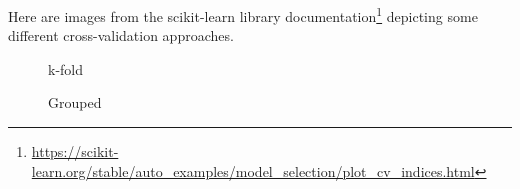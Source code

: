 \documentclass[
  letterpaper,
]{krantz}
\DeclareRobustCommand{\href}[2]{#2\footnote{\url{#1}}}
\begin{document}
Here are images from the
\href{https://scikit-learn.org/stable/auto_examples/model_selection/plot_cv_indices.html}{scikit-learn
library documentation} depicting some different cross-validation
approaches.

\begin{figure}

\begin{minipage}[t]{0.50\linewidth}

{\centering 


\caption{k-fold}

}

\end{minipage}%
%
\begin{minipage}[t]{0.50\linewidth}

{\centering 


\caption{Grouped}

}
\end{minipage}
\end{figure}
\end{document}
